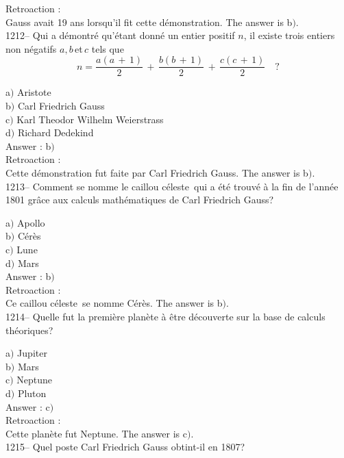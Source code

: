 ﻿\documentclass[letterpaper, 12pt]{article}
\begin{document}
Retroaction : \\
Gauss avait 19 ans lorsqu'il fit cette d\'emonstration.
The answer is b$)$.\\

1212-- Qui a d\'emontr\'e qu'\'etant donn\'e un entier positif $n$,
il existe trois entiers non n\'egatifs $a,b\,$et$\,c$ tels que
$$\displaystyle{n=\frac{a(a\,+\,1)}2\,+\,\frac{b(b\,+\,1)}2\,+\,\frac{c(c\,+\,1)}2}\quad?$$

a$)$ Aristote \\
b$)$ Carl Friedrich Gauss \\
c$)$ Karl Theodor Wilhelm Weierstrass \\
d$)$ Richard Dedekind\\

Answer : b$)$\\

Retroaction : \\
Cette d\'emonstration fut faite par Carl Friedrich Gauss.
The answer is b$)$.\\

1213-- Comment se nomme le \og caillou c\'eleste\fg\ qui a \'et\'e
trouv\'e \`a la fin de l'ann\'ee 1801 gr\^ace aux calculs
math\'ematiques de Carl Friedrich Gauss?

a$)$ Apollo \\
b$)$ C\'er\`es \\
c$)$ Lune \\
d$)$ Mars\\

Answer : b$)$\\

Retroaction : \\
Ce \og caillou c\'eleste\fg\ se nomme C\'er\`es.
The answer is b$)$.\\

1214-- Quelle fut la premi\`ere plan\`ete \`a \^etre d\'ecouverte
sur la base de calculs th\'eoriques?

a$)$ Jupiter \\
b$)$ Mars \\
c$)$ Neptune \\
d$)$ Pluton\\

Answer : c$)$\\

Retroaction : \\
Cette plan\`ete fut Neptune.
The answer is c$)$.\\

1215-- Quel poste Carl Friedrich Gauss obtint-il en 1807?
\end{document}
